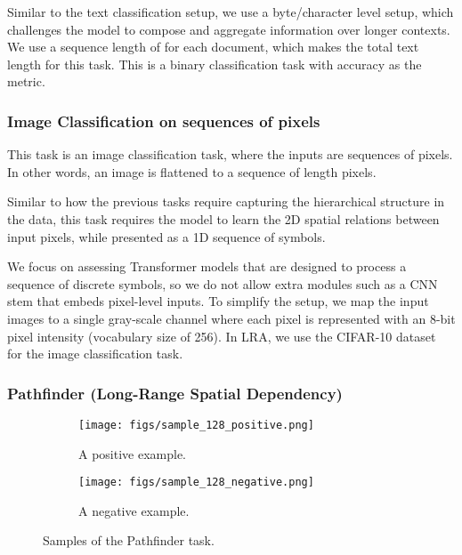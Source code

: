 \documentclass{article} \usepackage{iclr2021_conference,times}
\begin{document}
    Similar to the text classification setup, we use a byte/character level setup, which challenges the model to compose and aggregate information over longer contexts. We use a sequence length of  for each document, which makes the total text length  for this task. This is a binary classification task with accuracy as the metric.
    \subsubsection{Image Classification on sequences of pixels} 
    This task is an image classification task, where the inputs are sequences of pixels. In other words, an  image is flattened to a sequence of length  pixels. 
    
    Similar to how the previous tasks require capturing the hierarchical structure in the data, this task requires the model to learn the 2D spatial relations between input pixels, while presented as a 1D sequence of symbols. 
    
    We focus on assessing Transformer models that are designed to process a sequence of discrete symbols, so we do not allow extra modules such as a CNN stem that embeds pixel-level inputs. To simplify the setup, we map the input images to a single gray-scale channel where each pixel is represented with an 8-bit pixel intensity (vocabulary size of 256). In LRA, we use the CIFAR-10 dataset~\citep{Krizhevsky09learningmultiple} for the image classification task.
    
    \subsubsection{Pathfinder (Long-Range Spatial Dependency)} 
    \begin{wrapfigure}{t}{0.38\textwidth}
    \vspace{-10pt}
     \centering
     \begin{subfigure}[b]{0.3\textwidth}
         \centering
         \texttt{[image: figs/sample\_128\_positive.png]}
         \vspace{-5pt}
         \caption{A positive example.}
         \label{fig:path_finder_pos}
     \end{subfigure}
\begin{subfigure}[b]{0.3\textwidth}
         \centering
         \texttt{[image: figs/sample\_128\_negative.png]}
         \vspace{-5pt}
         \caption{A negative example.}
         \label{fig:path_finder_neg}
     \end{subfigure}
     \caption{Samples of the Pathfinder task.}
    \label{fig:path_finder}
    \vspace{-45pt}
    \end{wrapfigure}
\end{document}

